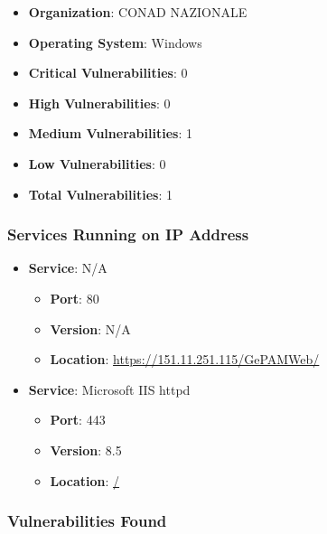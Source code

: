 \documentclass{article}
\begin{document}
\begin{itemize}
    \item \textbf{Organization}: CONAD NAZIONALE
    \item \textbf{Operating System}:  Windows 
    \item \textbf{Critical Vulnerabilities}: 0
    \item \textbf{High Vulnerabilities}: 0
    \item \textbf{Medium Vulnerabilities}: 1
    \item \textbf{Low Vulnerabilities}: 0
    \item \textbf{Total Vulnerabilities}: 1
\end{itemize}

\subsubsection*{Services Running on IP Address}

\begin{itemize}
    
        \item \textbf{Service}: N/A
        \begin{itemize}
            \item \textbf{Port}: 80
            \item \textbf{Version}:  N/A 
            \item \textbf{Location}: \href{ https://151.11.251.115/GePAMWeb/ }{ https://151.11.251.115/GePAMWeb/ }
        \end{itemize}
    
        \item \textbf{Service}: Microsoft IIS httpd
        \begin{itemize}
            \item \textbf{Port}: 443
            \item \textbf{Version}:  8.5 
            \item \textbf{Location}: \href{ / }{ / }
        \end{itemize}
    
\end{itemize}


\subsubsection*{Vulnerabilities Found}
\end{document}
